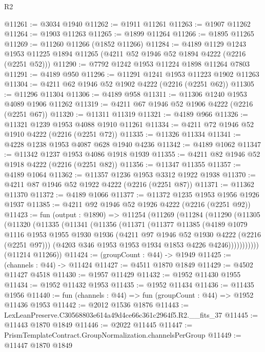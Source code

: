 \begin{lexlean}{R2}
\begin{coremodule}
@11261 := @3034 @1940
@11262 := @1911 @11261
@11263 := @1907 @11262
@11264 := @1903 @11263
@11265 := @1899 @11264
@11266 := @1895 @11265
@11269 := @11260 @11266 (@1852 @11266)
@11284 := @4189
    @1129
    @1243
    @1953
    @11225
    @1894
    @11265
    (@4211 @52 @1946 @52 @1894 @4222 (@2216 (@2251 @52)))
@11290 := @7792 @1242 @1953 @11224 @1898 @11264 @7803
@11291 := @4189 @950
@11296 := @11291 @1241 @1953 @11223 @1902 @11263
@11304 := @4211 @62 @1946 @52 @1902 @4222 (@2216 (@2251 @62))
@11305 := @11296 @11304
@11306 := @4189 @958
@11311 := @11306 @1240 @1953 @4089 @1906 @11262
@11319 := @4211 @67 @1946 @52 @1906 @4222 (@2216 (@2251 @67))
@11320 := @11311 @11319
@11321 := @4189 @966
@11326 := @11321 @1239 @1953 @4088 @1910 @11261
@11334 := @4211 @72 @1946 @52 @1910 @4222 (@2216 (@2251 @72))
@11335 := @11326 @11334
@11341 := @4228 @1238 @1953 @4087 @628 @1940 @4236
@11342 := @4189 @1062
@11347 := @11342 @1237 @1953 @4086 @1918 @1939
@11355 := @4211 @82 @1946 @52 @1918 @4222 (@2216 (@2251 @82))
@11356 := @11347 @11355
@11357 := @4189 @1064
@11362 := @11357 @1236 @1953 @3312 @1922 @1938
@11370 := @4211 @87 @1946 @52 @1922 @4222 (@2216 (@2251 @87))
@11371 := @11362 @11370
@11372 := @4189 @1066
@11377 := @11372 @1235 @1953 @1956 @1926 @1937
@11385 := @4211 @92 @1946 @52 @1926 @4222 (@2216 (@2251 @92))
@11423 := fun (output : @1890) =>
  @11254
    (@11269
      (@11284
        (@11290
          (@11305
            (@11320
              (@11335
                (@11341
                  (@11356
                    (@11371
                      (@11377
                        @11385
                        (@4189
                          @1079
                          @1116
                          @1953
                          @1955
                          @1930
                          @1936
                          (@4211 @97 @1946 @52 @1930 @4222 (@2216 (@2251 @97)))
                          (@4203 @346 @1953 @1953 @1934 @1853 @4226 @4246)))))))))))
      (@11214 @11266))
@11424 := (groupCount : @44) -> @1949
@11425 := (channels : @44) -> @11424
@11427 := @4511 @1870 @1849
@11429 := @4502 @11427 @4518
@11430 := @1957 @11429
@11432 := @1952 @11430 @1955
@11434 := @1952 @11432 @1953
@11435 := @1952 @11434
@11436 := @11435 @1956
@11440 := fun (channels : @44) => fun (groupCount : @44) => @1952 @11436 @1953
@11442 := @2012 @1536 @1876
@11443 := LexLeanPreserve.C30568803e614a49d4ce66c361c2964f5.R2.__fits_37
@11445 := @11443 @1870 @1849
@11446 := @2022 @11445
@11447 := PrismTemplateContract.GroupNormalization.channelsPerGroup
@11449 := @11447 @1870 @1849

\end{coremodule}
\end{lexlean}
